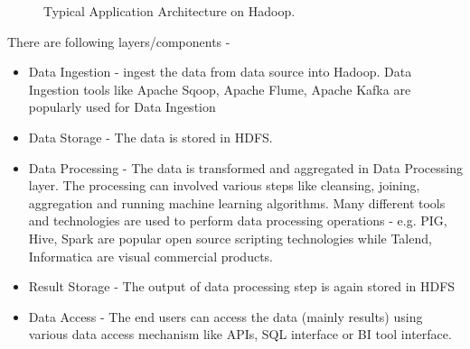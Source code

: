 \documentclass[9pt,twocolumn,twoside]{styles/osajnl}
\begin{document}
\begin{figure}[htbp]
\centering
{}
\caption{Typical Application Architecture on Hadoop.}
\label{fig:hadoop-arch}
\end{figure}

There are following layers/components -

\begin{itemize}
\item Data Ingestion - ingest the data from data source into Hadoop.
Data Ingestion tools like Apache Sqoop, Apache Flume, Apache Kafka are
popularly used for Data Ingestion
\item Data Storage - The data is stored in HDFS.
\item Data Processing - The data is transformed and aggregated in Data
Processing layer. The processing can involved various steps like cleansing,
joining, aggregation and running machine learning algorithms. Many different
tools and technologies are used to perform data processing operations - e.g.
PIG, Hive, Spark are popular open source scripting technologies while
Talend, Informatica are visual commercial products.
\item Result Storage - The output of data processing step is again stored in
HDFS
\item Data Access - The end users can access the data (mainly results)
using various data access mechanism like APIs, SQL interface or BI tool
interface.
\end{itemize}
\end{document}
